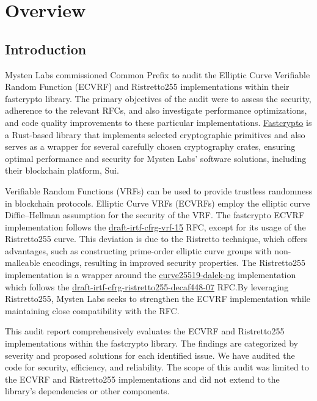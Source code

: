 \section{Overview}
\subsection{Introduction}
Mysten Labs commissioned Common Prefix to audit the Elliptic Curve Verifiable Random Function (ECVRF) and Ristretto255 implementations within their fastcrypto library. The primary objectives of the audit were to assess the security, adherence to the relevant RFCs, and also investigate performance optimizations, and code quality improvements to these particular implementations. \href{https://github.com/MystenLabs/fastcrypto}{Fastcrypto} is a Rust-based library that implements selected cryptographic primitives and also serves as a wrapper for several carefully chosen cryptography crates, ensuring optimal performance and security for Mysten Labs' software solutions, including their blockchain platform, Sui.

Verifiable Random Functions (VRFs) can be used to provide trustless randomness in blockchain protocols\cite{praos,algorand}. Elliptic Curve VRFs (ECVRFs) employ the elliptic curve Diffie--Hellman assumption for the security of the VRF\cite{vrf}. The fastcrypto ECVRF implementation follows the \href{https://datatracker.ietf.org/doc/draft-irtf-cfrg-vrf/}{draft-irtf-cfrg-vrf-15} RFC\cite{vrf-rfc}, except for its usage of the Ristretto255 curve. This deviation is due to the Ristretto technique, which offers advantages, such as constructing prime-order elliptic
curve groups with non-malleable encodings, resulting in improved security properties\cite{ristretto255-rfc}. The Ristretto255 implementation is a wrapper around the \href{https://github.com/zkcrypto/curve25519-dalek-ng}{curve25519-dalek-ng} implementation which follows the \href{https://datatracker.ietf.org/doc/draft-irtf-cfrg-ristretto255-decaf448/}{draft-irtf-cfrg-ristretto255-decaf448-07} RFC\cite{ristretto255-rfc}.By leveraging Ristretto255, Mysten Labs seeks to strengthen the ECVRF implementation while maintaining close compatibility with the RFC. 

This audit report comprehensively evaluates the ECVRF and Ristret\-to255 implementations within the fastcrypto library. The findings are categorized by severity and proposed solutions for each identified issue. We have audited the code for security, efficiency, and reliability. The scope of this audit was limited to the ECVRF and Ristretto255 implementations and did not extend to the library's dependencies or other components. 

